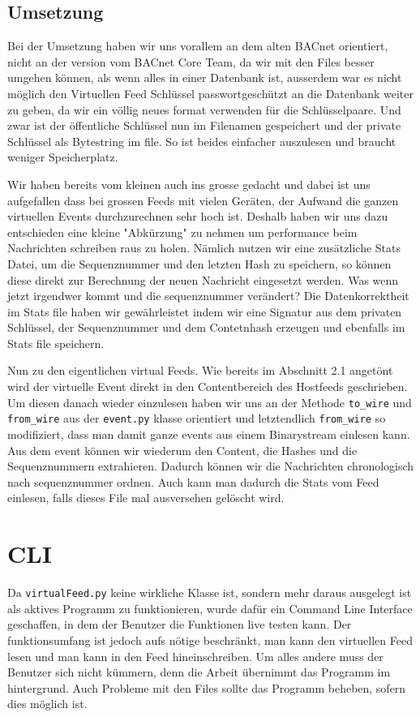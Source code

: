 \documentclass[a4paper,titlepage]{article}
\newcommand{\ilc}[1]{\textcolor{codeColor}{\texttt{#1}}}
\begin{document}
\subsection{Umsetzung}
Bei der Umsetzung haben wir uns vorallem an dem alten BACnet orientiert, nicht an der version vom BACnet Core Team, da wir mit den Files besser umgehen können, als wenn alles in einer Datenbank ist, ausserdem war es nicht möglich den Virtuellen Feed Schlüssel passwortgeschützt an die Datenbank weiter zu geben, da wir ein völlig neues format verwenden für die Schlüsselpaare. Und zwar ist der öffentliche Schlüssel nun im Filenamen gespeichert und der private Schlüssel als Bytestring im file. So ist beides einfacher auszulesen und braucht weniger Speicherplatz.

Wir haben bereits vom kleinen auch ins grosse gedacht und dabei ist uns aufgefallen dass bei grossen Feeds mit vielen Geräten, der Aufwand die ganzen virtuellen Events durchzurechnen sehr hoch ist. Deshalb haben wir uns dazu entschieden eine kleine "Abkürzung" zu nehmen um performance beim Nachrichten schreiben raus zu holen. Nämlich nutzen wir eine zusätzliche Stats Datei, um die  Sequenznummer und den letzten Hash zu speichern, so können diese direkt zur Berechnung der neuen Nachricht eingesetzt werden. Was wenn jetzt irgendwer kommt und die sequenznummer verändert? Die Datenkorrektheit im Stats file haben wir gewährleistet indem wir eine Signatur aus dem privaten Schlüssel, der Sequenznummer und dem Contetnhash erzeugen und ebenfalls im Stats file speichern.

Nun zu den eigentlichen virtual Feeds. Wie bereits im Abschnitt 2.1 angetönt wird der virtuelle Event direkt in den Contentbereich des Hostfeeds geschrieben. Um diesen danach wieder einzulesen haben wir uns an der Methode \ilc{to\_wire} und \ilc{from\_wire} aus der \ilc{event.py} klasse orientiert und letztendlich \ilc{from\_wire} so modifiziert, dass man damit ganze events aus einem Binarystream einlesen kann. 
Aus dem event können wir wiederum den Content, die Hashes und die Sequenznummern extrahieren. Dadurch können wir die Nachrichten chronologisch nach sequenznummer ordnen. Auch kann man dadurch die Stats vom Feed einlesen, falls dieses File mal ausversehen gelöscht wird.

\section{CLI}
Da \ilc{virtualFeed.py}  keine wirkliche Klasse ist, sondern mehr daraus ausgelegt ist als aktives Programm zu funktionieren, wurde dafür ein Command Line Interface geschaffen, in dem der Benutzer die  Funktionen live testen kann. Der funktionsumfang ist jedoch aufs nötige beschränkt, man kann den virtuellen Feed lesen und man kann in den Feed hineinschreiben. Um alles andere muss der Benutzer sich nicht kümmern, denn die Arbeit übernimmt das Programm im hintergrund. Auch Probleme mit den Files sollte das Programm beheben, sofern dies möglich ist.
\end{document}
